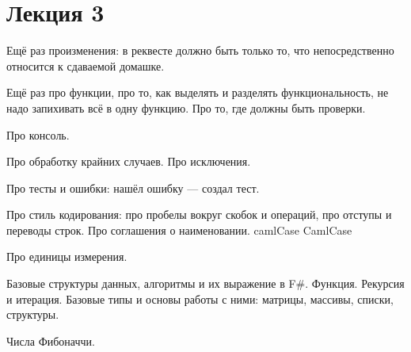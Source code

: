 \section{Лекция 3}

	Ещё раз произменения: в реквесте должно быть только то, что непосредственно относится к сдаваемой домашке.

	Ещё раз про функции, про то, как выделять и разделять функциональность, не надо запихивать всё в одну функцию. Про то, где должны быть проверки.

	Про консоль.

	Про обработку крайних случаев. Про исключения.

	Про тесты и ошибки: нашёл ошибку --- создал тест.

	Про стиль кодирования: про пробелы вокруг скобок и операций, про отступы и переводы строк. Про соглашения о наименовании. camlCase CamlCase


	Про единицы измерения.

    Базовые структуры данных, алгоритмы и их выражение в F\#. Функция. Рекурсия и итерация.  Базовые типы и основы работы с ними: матрицы, массивы, списки, структуры. 


    Числа Фибоначчи.